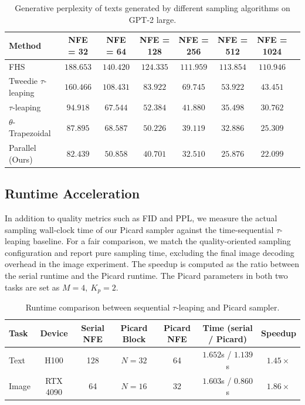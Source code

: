 \documentclass{article}
\begin{document}
\begin{table}[t]
\centering
\captionsetup{skip=8pt}
\small
\caption{Generative perplexity of texts generated by different sampling algorithms on GPT-2 large.}
\label{tab:generative_perplexity_gpt2_large}
\begin{tabular}{lccccccc}
\toprule
\textbf{Method}  & NFE = 32 & NFE = 64 & NFE = 128 & NFE = 256 & NFE = 512 & NFE = 1024 \\
\midrule
FHS &  $ 188.653$ & $ 140.420$ & $ 124.335$ & $ 111.959$ & $ 113.854$ & $ 110.946$ \\
Tweedie $\tau$-leaping & $ 160.466$ & $ 108.431$ & $ 83.922$ & $ 69.745$ & $ 53.922$ & $ 43.451$ \\
$\tau$-leaping & $ 94.918$ & $ 67.544$ & $ 52.384$ & $ 41.880$ & $ 35.498$ & $ 30.762$ \\
$\theta$-Trapezoidal & $ 87.895$ & $ 68.587$ & $ 50.226$ & $ 39.119$ & $ 32.886$ & $ 25.309$ \\
Parallel (Ours) & $ \boldsymbol{82.439}$ & $ \boldsymbol{50.858}$ & $ \boldsymbol{40.701}$ & $ \boldsymbol{32.510}$ & $ \boldsymbol{25.876}$ & $ \boldsymbol{22.099}$ \\
\bottomrule
\end{tabular}
\end{table}





\subsection{Runtime Acceleration}
\label{sec:runtime-acceleration}

In addition to quality metrics such as FID and PPL, we measure the actual sampling wall-clock time of our Picard sampler against the time-sequential $\tau$-leaping baseline. 
For a fair comparison, we match the quality-oriented sampling configuration and report pure sampling time, excluding the final image decoding overhead in the image experiment. 
The speedup is computed as the ratio between the serial runtime and the Picard runtime. The Picard parameters in both two tasks are set as $M=4,\ K_p=2$.

\begin{table}[ht]
\centering
\captionsetup{skip=8pt}
\caption{Runtime comparison between sequential $\tau$-leaping and Picard sampler. }
\label{tab:runtime-speedup}
\small
\setlength{\tabcolsep}{4.5pt}
\begin{tabular}{lcccccc}
\toprule
Task & Device & Serial NFE & Picard Block  & Picard NFE & Time (serial / Picard) & Speedup \\
\midrule
Text 
& H100 
& 128 
& $ N=32$ 
& 64 
& $1.652$s / $1.139$s 
& $1.45\times$ \\
Image 
& RTX 4090 
& 64 
& $ N=16$ 
& 32 
& $1.603$s / $0.860$s 
& $1.86\times$ \\
\bottomrule
\end{tabular}
\end{table}
\end{document}

